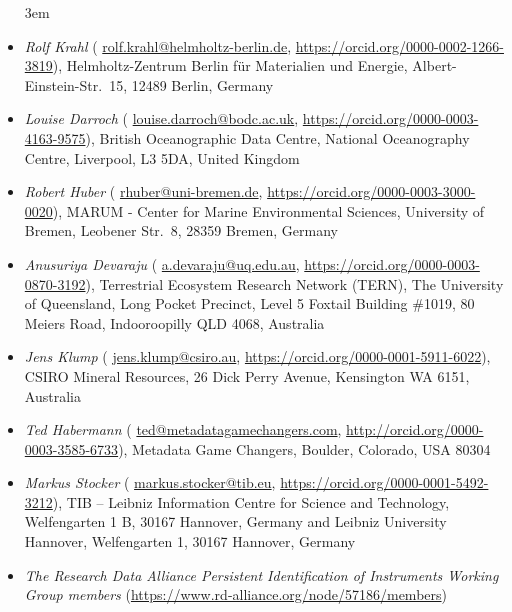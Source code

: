 \documentclass[titlepage=true,twoside=false,DIV=13]{scrartcl}
\begin{document}
\begin{itemize}\emergencystretch 3em
\item \emph{Rolf Krahl}
  ({\small
  \href{mailto:rolf.krahl@helmholtz-berlin.de}{rolf.krahl@helmholtz-berlin.de},
  \url{https://orcid.org/0000-0002-1266-3819}}),
  Helmholtz-Zentrum Berlin für Materialien und Energie,
  Albert-Einstein-Str.\ 15, 12489 Berlin, Germany
\item \emph{Louise Darroch}
  ({\small
  \href{mailto:louise.darroch@bodc.ac.uk}{louise.darroch@bodc.ac.uk},
  \url{https://orcid.org/0000-0003-4163-9575}}),
  British Oceanographic Data Centre, National Oceanography Centre,
  Liverpool, L3 5DA, United Kingdom
\item \emph{Robert Huber}
  ({\small
  \href{mailto:rhuber@uni-bremen.de}{rhuber@uni-bremen.de},
  \url{https://orcid.org/0000-0003-3000-0020}}),
  MARUM - Center for Marine Environmental Sciences, University of Bremen,
  Leobener Str.\ 8, 28359 Bremen, Germany
\item \emph{Anusuriya Devaraju}
  ({\small
  \href{mailto:a.devaraju@uq.edu.au}{a.devaraju@uq.edu.au},
  \url{https://orcid.org/0000-0003-0870-3192}}),
  Terrestrial Ecosystem Research Network (TERN), The University of
  Queensland, Long Pocket Precinct, Level 5 Foxtail Building \#1019,
  80 Meiers Road, Indooroopilly QLD 4068, Australia
\item \emph{Jens Klump}
  ({\small
  \href{mailto:jens.klump@csiro.au}{jens.klump@csiro.au},
  \url{https://orcid.org/0000-0001-5911-6022}}),
  CSIRO Mineral Resources, 26 Dick Perry Avenue, Kensington WA 6151,
  Australia
\item \emph{Ted Habermann}
  ({\small
  \href{mailto:ted@metadatagamechangers.com}{ted@metadatagamechangers.com},
  \url{http://orcid.org/0000-0003-3585-6733}}),
  Metadata Game Changers, Boulder, Colorado, USA 80304
\item \emph{Markus Stocker}
  ({\small
  \href{mailto:markus.stocker@tib.eu}{markus.stocker@tib.eu},
  \url{https://orcid.org/0000-0001-5492-3212}}),
  TIB -- Leibniz Information Centre for Science and Technology,
  Welfengarten 1 B, 30167 Hannover, Germany and
  Leibniz University Hannover, Welfengarten 1, 30167 Hannover, Germany
\item \emph{The Research Data Alliance Persistent Identification of Instruments
  Working Group members}
  ({\small \url{https://www.rd-alliance.org/node/57186/members}})
\end{itemize}

\tableofcontents
\cleardoublepage
{}
\end{document}
